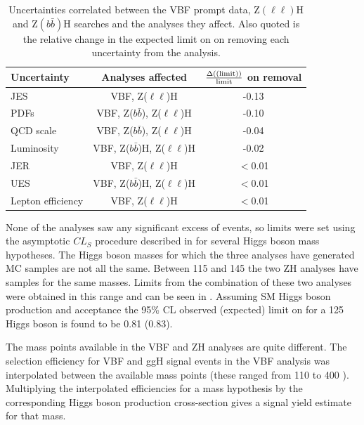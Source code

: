 \begin{table}
  \caption{Uncertainties correlated between the VBF prompt data, Z$(\ell\ell)$H and Z$(b\bar{b})$H searches and the analyses they affect. Also quoted is the relative change in the expected limit on \BRinv on removing each uncertainty from the analysis.}
  \label{tab:promptcorrs}
  \begin{tabular}{lcc}
    \hline
    \hline
    Uncertainty & Analyses affected & $\frac{\Delta(\rm(limit))}{\rm{limit}}$ on removal \\
    \hline
    \ac{JES} & VBF, Z($\ell\ell$)H & -0.13 \\
    PDFs & VBF, Z($b\bar{b}$), Z($\ell\ell$)H & -0.10 \\
    QCD scale & VBF, Z($b\bar{b}$), Z($\ell\ell$)H & -0.04\\
    Luminosity & VBF, Z($b\bar{b}$)H, Z($\ell\ell$)H & -0.02\\
    \ac{JER} & VBF, Z($\ell\ell$)H & $<$0.01\\
    \ac{UES} & VBF, Z($b\bar{b}$)H, Z($\ell\ell$)H & $<$0.01\\
    Lepton efficiency & VBF, Z($\ell\ell$)H & $<$0.01\\
    \hline
    \hline
  \end{tabular}
\end{table}

None of the analyses saw any significant excess of events, so limits were set using the asymptotic $CL_{S}$ procedure described in  for several Higgs boson mass hypotheses. The Higgs boson masses for which the three analyses have generated \ac{MC} samples are not all the same. Between 115 and 145 \GeV the two ZH analyses have samples for the same masses. Limits from the combination of these two analyses were obtained in this range and can be seen in . Assuming \ac{SM} Higgs boson production and acceptance the 95\% \ac{CL} observed (expected) limit on \BRinv for a 125 \GeV Higgs boson is found to be 0.81 (0.83).

The mass points available in the \ac{VBF} and ZH analyses are quite different. The selection efficiency for \ac{VBF} and \ac{ggH} signal events in the \ac{VBF} analysis was interpolated between the available mass points (these ranged from 110 to 400 \GeV). Multiplying the interpolated efficiencies for a mass hypothesis by the corresponding Higgs boson production cross-section gives a signal yield estimate for that mass. 

